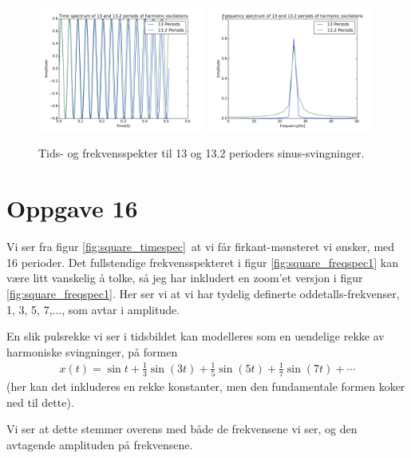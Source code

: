 \documentclass[12p,a4paper]{article}
\begin{document}
\begin{figure}[H]
\centering
\includegraphics[width=0.49\textwidth]{fig/timespec.pdf}
\includegraphics[width=0.49\textwidth]{fig/freqspec.pdf}
\caption{Tids- og frekvensspekter til 13 og 13.2 perioders sinus-svingninger.}
\label{fig:13}
\end{figure}



\section*{Oppgave 16}

Vi ser fra figur \ref{fig:square_timespec} at vi får firkant-mønsteret vi ønsker, med 16 perioder. Det fullstendige frekvensspekteret i figur \ref{fig:square_freqspec1} kan være litt vanskelig å tolke, så jeg har inkludert en zoom'et versjon i figur \ref{fig:square_freqspec1}. Her ser vi at vi har tydelig definerte oddetalls-frekvenser, 1, 3, 5, 7,..., som avtar i amplitude.

En slik pulsrekke vi ser i tidsbildet kan modelleres som en uendelige rekke av harmoniske svingninger, på formen
\begin{align*}
x(t) = \sin{t} + \frac{1}{3}\sin(3t) + \frac{1}{5}\sin(5t) + \frac{1}{7}\sin(7t) + \cdots
\end{align*}
(her kan det inkluderes en rekke konstanter, men den fundamentale formen koker ned til dette).

Vi ser at dette stemmer overens med både de frekvensene vi ser, og den avtagende amplituden på frekvensene.
\end{document}
